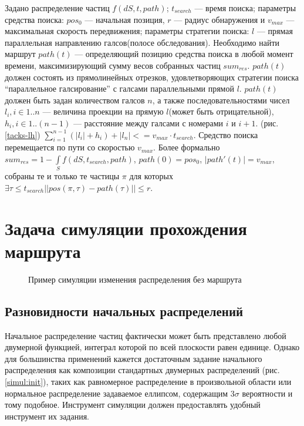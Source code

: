 Задано распределение частиц $f(dS, t, path)$; $t_{search}$ --- время поиска;
параметры средства поиска: $pos_0$ --- начальная позиция, $r$ --- радиус обнаружения и 
$v_{max}$ --- максимальная скорость передвижения; параметры стратегии поиска: $l$ --- прямая
параллельная направлению галсов(полосе обследования).
 Необходимо найти маршрут $path(t)$ --- определяющий
позицию средства поиска в любой момент времени, максимизирующий сумму весов собранных
частиц $sum_{res}$. $path(t)$ должен состоять из прямолинейных отрезков, удовлетворяющих
стратегии поиска ``параллельное галсирование'' с галсами параллельными прямой $l$.
$path(t)$ должен быть задан количеством галсов $n$, а также последовательностями чисел
$l_i, i \in 1..n$ --- величина проекции на прямую $l$(может быть отрицательной),
$h_i, i \in 1..(n-1)$ --- расстояние между галсами с номерами $i$ и $i+1$. (рис. \ref{tacks-lh})
$\sum\limits_{i=1}^{n-1} (|l_i|+h_i) + |l_n| <= v_{max} \cdot t_{search}$. Средство поиска 
перемещается по пути со скоростью $v_{max}$.
Более формально $sum_{res}=1-\int\limits_Sf(dS, t_{search}, path)$, $path(0)=pos_0$,
$|path'(t)| = v_{max}$, собраны те и только те частицы
$\pi$ для которых $\exists \tau\le t_{search} ||pos(\pi, \tau)-path(\tau)|| \le r$. 

\FloatBarrier
\section{Задача симуляции прохождения маршрута}

\begin{figure}[ht]
  \begin{center}
  \end{center}
  \caption{Пример симуляции изменения распределения без маршрута}
\end{figure}

\subsection{Разновидности начальных распределений}
Начальное распределение частиц фактически может быть представлено любой двумерной функцией,
интеграл которой по всей плоскости равен единице. Однако для большинства применений кажется
достаточным задание начального распределения как композиции стандартных двумерных распределений
(рис. \ref{simul:init}), таких как равномерное распределение в произвольной области или
 нормальное распределение задаваемое еллипсом, содержащим $3\sigma$ вероятности и тому подобное.
 Инструмент симуляции должен предоставлять удобный инструмент их задания.
\FloatBarrier
